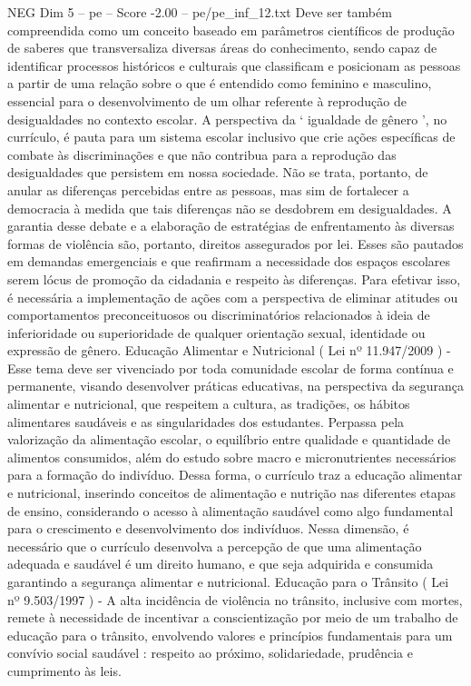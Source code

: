 \begin{textsample}{NEG Dim 5 – pe – Score -2.00 – pe/pe\_inf\_12.txt}
Deve ser também compreendida como um conceito baseado em parâmetros científicos de produção de saberes que transversaliza diversas áreas do conhecimento, sendo capaz de identificar processos históricos e culturais que classificam e posicionam as pessoas a partir de uma relação sobre o que é entendido como feminino e masculino, essencial para o desenvolvimento de um olhar referente à reprodução de desigualdades no contexto escolar.
A perspectiva da ‘ igualdade de gênero ’, no currículo, é pauta para um sistema escolar inclusivo que crie ações específicas de combate às discriminações e que não contribua para a reprodução das desigualdades que persistem em nossa sociedade.
Não se trata, portanto, de anular as diferenças percebidas entre as pessoas, mas sim de fortalecer a democracia à medida que tais diferenças não se desdobrem em desigualdades.
A garantia desse debate e a elaboração de estratégias de enfrentamento às diversas formas de violência são, portanto, direitos assegurados por lei.
Esses são pautados em demandas emergenciais e que reafirmam a necessidade dos espaços escolares serem lócus de promoção da cidadania e respeito às diferenças.
Para efetivar isso, é necessária a implementação de ações com a perspectiva de eliminar atitudes ou comportamentos preconceituosos ou discriminatórios relacionados à ideia de inferioridade ou superioridade de qualquer orientação sexual, identidade ou expressão de gênero.
Educação Alimentar e Nutricional ( Lei nº 11.947/2009 ) - Esse tema deve ser vivenciado por toda comunidade escolar de forma contínua e permanente, visando desenvolver práticas educativas, na perspectiva da segurança alimentar e nutricional, que respeitem a cultura, as tradições, os hábitos alimentares saudáveis e as singularidades dos estudantes.
Perpassa pela valorização da alimentação escolar, o equilíbrio entre qualidade e quantidade de alimentos consumidos, além do estudo sobre macro e micronutrientes necessários para a formação do indivíduo.
Dessa forma, o currículo traz a educação alimentar e nutricional, inserindo conceitos de alimentação e nutrição nas diferentes etapas de ensino, considerando o acesso à alimentação saudável como algo fundamental para o crescimento e desenvolvimento dos indivíduos.
Nessa dimensão, é necessário que o currículo desenvolva a percepção de que uma alimentação adequada e saudável é um direito humano, e que seja adquirida e consumida garantindo a segurança alimentar e nutricional.
Educação para o Trânsito ( Lei nº 9.503/1997 ) - A alta incidência de violência no trânsito, inclusive com mortes, remete à necessidade de incentivar a conscientização por meio de um trabalho de educação para o trânsito, envolvendo valores e princípios fundamentais para um convívio social saudável : respeito ao próximo, solidariedade, prudência e cumprimento às leis.

\end{textsample}
